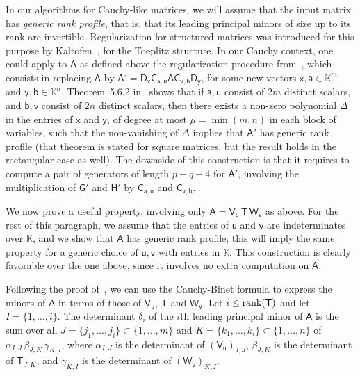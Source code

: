 \documentclass[sigconf]{acmart}
\newcommand{\va}{\ensuremath{\mathsf{a}}}
\newcommand{\vb}{\ensuremath{\mathsf{b}}}
\newcommand{\vu}{\ensuremath{\mathsf{u}}}
\newcommand{\vv}{\ensuremath{\mathsf{v}}}
\newcommand{\vx}{\ensuremath{\mathsf{x}}}
\newcommand{\vy}{\ensuremath{\mathsf{y}}}
\newcommand{\mA}{\ensuremath{\mathsf{A}}}
\newcommand{\mC}{\ensuremath{\mathsf{C}}}
\newcommand{\mD}{\ensuremath{\mathsf{D}}}
\newcommand{\mG}{\ensuremath{\mathsf{G}}}
\newcommand{\mH}{\ensuremath{\mathsf{H}}}
\newcommand{\mT}{\ensuremath{\mathsf{T}}}
\newcommand{\mV}{\ensuremath{\mathsf{V}}}
\newcommand{\mW}{\ensuremath{\mathsf{W}}}
\newcommand{\K}{\ensuremath{\mathbb{K}}}
\newcommand{\mn}{\ensuremath{\mu}}
\theoremstyle{acmdefinition}
\begin{document}
\smallskip{}  In our algorithms for
Cauchy-like matrices, we will assume that the input matrix has {\em
  generic rank profile}, that is, that its leading principal minors of
size up to its rank are invertible.  Regularization for structured
matrices was introduced for this purpose by
Kaltofen~\cite{Kaltofen94}, for the Toeplitz structure. In our Cauchy
context, one could apply to $\mA$ as defined above the regularization
procedure from~\cite[Section~5.6]{Pan01}, which consists in replacing
$\mA$ by $\mA' = \mD_\vx \mC_{\va,\vu} \mA \mC_{\vv,\vb}\mD_\vy$,
for some new vectors $\vx,\va \in \K^m$ and $\vy,\vb \in
\K^n$. Theorem~5.6.2 in~\cite{Pan01} shows that if $\va,\vu$ consist
of $2m$ distinct scalars, and $\vb,\vv$ consist of $2n$ distinct
scalars, then there exists a non-zero polynomial $\Delta$ in the
entries of $\vx$ and $\vy$, of degree at most $\mn=\min(m,n)$ in each
block of variables, such that the non-vanishing of $\Delta$ implies
that $\mA'$ has generic rank profile (that theorem is stated for
square matrices, but the result holds in the rectangular case as
well).  The downside of this construction is that it requires to
compute a pair of generators of length $p+q+4$ for $\mA'$, involving
the multiplication of $\mG'$ and $\mH'$ by $\mC_{\va,\vu}$ and
$\mC_{\vv,\vb}$.

\smallskip

We now prove a useful property, involving only  $\mA = \mV_\vu\, \mT\,
\mW_\vv$ as above. For the rest of this paragraph, we assume that the
entries of $\vu$ and $\vv$ are indeterminates over $\K$, and we show
that $\mA$ has generic rank profile; this will imply the same
property for a generic choice of $\vu,\vv$ with entries in
$\K$. This construction is clearly favorable over the one above, since
it involves no extra computation on $\mA$.

Following the proof of~\cite[Theorem~5.6.2]{Pan01}, we can use the
Cauchy-Binet formula to express the minors of $\mA$ in terms of those
of $\mV_\vu$, $\mT$ and $\mW_\vv$. Let $i \le {\rm
  rank}(\mT)$ and let $I=\{1,\dots,i\}$. The determinant $\delta_i$ of
the $i$th leading principal minor of $\mA$ is the sum over all
$J=\{j_1,\dots,j_i\} \subset \{1,\dots,m\}$ and $K=\{k_1,\dots,k_i\}
\subset \{1,\dots,n\}$ of  $\alpha_{I,J}\, \beta_{J,K}\,
\gamma_{K,I}$, where $\alpha_{I,J}$ is the determinant of
$(\mV_\vu)_{I,J}$, $\beta_{J,K}$ is the determinant of $\mT_{J,K}$,
and $\gamma_{K,I}$ is the determinant of $(\mW_\vv)_{K,I}$.
\end{document}
